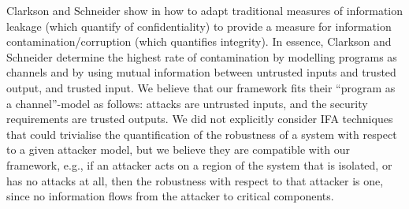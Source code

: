 {Clarkson and Schneider show in \cite{QuantitativeIntegrity} how to adapt traditional measures of information leakage (which quantify of confidentiality) to provide a measure for information contamination/corruption (which quantifies integrity). In essence, Clarkson and Schneider determine the highest rate of contamination by modelling programs as channels and by using mutual information between untrusted inputs and trusted output, and trusted input. We believe that our framework fits their ``program as a channel''-model as follows: attacks are untrusted inputs, and the security requirements are trusted outputs. We did not explicitly consider IFA techniques that could trivialise the quantification of the robustness of a system with respect to a given attacker model, but we believe they are compatible with our framework, e.g., if an attacker acts on a region of the system that is isolated, or has no attacks at all, then the robustness with respect to that attacker is one, since no information flows from the attacker to critical components.





{
}}
